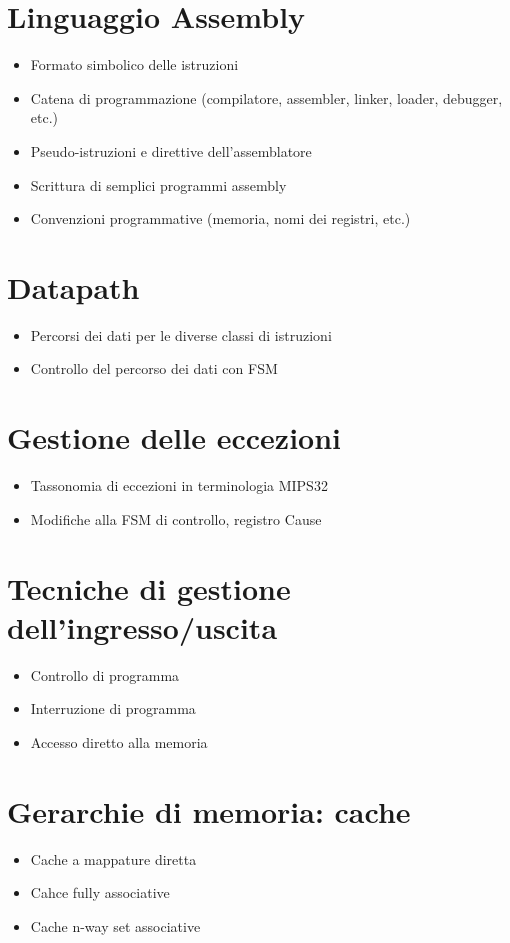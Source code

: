 \documentclass[12pt, a4paper, openany]{book}
\begin{document}
\section{Linguaggio Assembly}
\begin{itemize}
    \item Formato simbolico delle istruzioni
    \item Catena di programmazione (compilatore, assembler, linker, loader, debugger, etc.)
    \item Pseudo-istruzioni e direttive dell'assemblatore
    \item Scrittura di semplici programmi assembly
    \item Convenzioni programmative (memoria, nomi dei registri, etc.)
\end{itemize}

\section{Datapath}
\begin{itemize}
    \item Percorsi dei dati per le diverse classi di istruzioni
    \item Controllo del percorso dei dati con FSM
\end{itemize}

\section{Gestione delle eccezioni}
\begin{itemize}
    \item Tassonomia di eccezioni in terminologia MIPS32
    \item Modifiche alla FSM di controllo, registro Cause
\end{itemize}

\section{Tecniche di gestione dell'ingresso/uscita}
\begin{itemize}
    \item Controllo di programma
    \item Interruzione di programma
    \item Accesso diretto alla memoria
\end{itemize}

\section{Gerarchie di memoria: cache}
\begin{itemize}
    \item Cache a mappature diretta
    \item Cahce fully associative
    \item Cache n-way set associative
\end{itemize}
\end{document}
